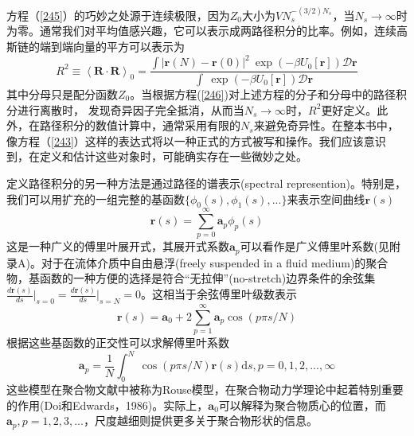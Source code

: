 方程（\ref{245}）的巧妙之处源于连续极限，因为$Z_0$大小为$VN_s^{−(3/2)N_s}$，当$N_s\rightarrow \infty$时为零。通常我们对平均值感兴趣，它可以表示成两路径积分的比率。例如，连续高斯链的端到端向量的平方可以表示为
\begin{equation}\label{246}
R^2\equiv \left \langle \mathbf{R}\cdot \mathbf{R}\right \rangle _0=\frac{\int \left| \mathbf{r}(N)-\mathbf{r}(0) \right|^2~\exp(-\beta U_0[\mathbf{r}]) \mathcal{D}\mathbf{r}}{\int ~\exp(-\beta U_0[\mathbf{r}]) \mathcal{D}\mathbf{r}} 
\end{equation}
其中分母只是配分函数$Z_0$。当根据方程(\ref{246})对上述方程的分子和分母中的路径积分进行离散时，
发现奇异因子完全抵消，从而当$N_s\rightarrow \infty$时，$R^2$更好定义。此外，在路径积分的数值计算中，通常采用有限的$N_s$来避免奇异性。在整本书中，像方程（\ref{243}）这样的表达式将以一种正式的方式被写和操作。我们应该意识到，在定义和估计这些对象时，可能确实存在一些微妙之处。

定义路径积分的另一种方法是通过路径的谱表示(spectral represention)。特别是，我们可以用扩充的一组完整的基函数$\lbrace \phi _0(s),\phi _1(s),... \rbrace$来表示空间曲线$\mathbf{r}(s)$
\begin{equation}\label{247}
\mathbf{r}(s)=\sum_{p=0}^{\infty} \mathbf{a}_p \phi _p(s)
\end{equation}
这是一种广义的傅里叶展开式，其展开式系数$\mathbf{a}_p$可以看作是广义傅里叶系数(见附录A)。对于在流体介质中自由悬浮(freely suspended in a fluid medium)的聚合物，基函数的一种方便的选择是符合“无拉伸”(no-stretch)边界条件的余弦集$\frac{d\mathbf{r}(s)}{ds}\vert _{s=0}=\frac{d\mathbf{r}(s)}{ds}\vert _{s=N}=0$。这相当于余弦傅里叶级数表示
\begin{equation}\label{248}
\mathbf{r}(s)=\mathbf{a}_0+2\sum_{p=1}^{\infty} \mathbf{a}_p \cos(p\pi s/N)
\end{equation}
根据这些基函数的正交性可以求解傅里叶系数
\begin{equation}\label{249}
\mathbf{a}_p=\frac{1}{N}\int_{0}^{N} ~\cos(p\pi s/N)\mathbf{r}(s) \mathrm{d}s,p=0,1,2,...,\infty
\end{equation}
这些模型在聚合物文献中被称为Rouse模型，在聚合物动力学理论中起着特别重要的作用(Doi和Edwards，1986)。实际上，$\mathbf{a}_0$可以解释为聚合物质心的位置，而$\mathbf{a}_p,p=1,2,3,...$，尺度越细则提供更多关于聚合物形状的信息。

